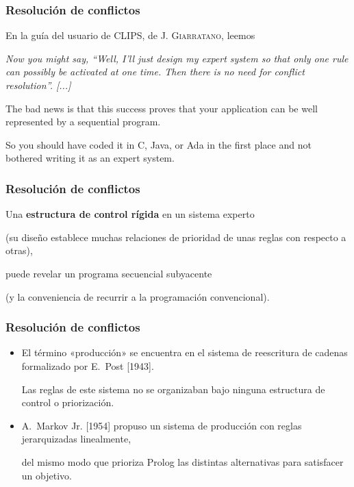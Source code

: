 \documentclass{beamer}    %
\begin{document}
\begin{frame}
 \frametitle{Resolución de conflictos}

 En la guía del usuario de CLIPS, de \textsc{J. Giarratano},
 leemos
 \vspace{5mm}

 \hfill\parbox{.85\linewidth}
 {\it Now you might say, “Well, I’ll just design my expert
   system so that only one rule can possibly be activated at
   one time. Then there is no need for conflict
   resolution”. [...]
   \vspace{2mm}

   The bad news is that this success proves that your
   application can be well represented by a sequential
   program.
   \vspace{2mm}

   So you should have coded it in C, Java, or Ada in the
   first place and not bothered writing it as an expert
   system.}
\end{frame}

\begin{frame}
 \frametitle{Resolución de conflictos}

 Una {\bf estructura de control rígida} en un sistema
 experto\\[2mm] \hfill\parbox{.85\linewidth}{(su diseño
   establece muchas relaciones de prioridad de unas reglas
   con respecto a otras),}
 \vspace{1cm}

 puede revelar un programa secuencial subyacente\\[2mm]
 \hfill\parbox{.85\linewidth}{(y la conveniencia de
   recurrir a la programación convencional).}
\end{frame}

\begin{frame}
 \frametitle{Resolución de conflictos}

 \begin{itemize}
 \item
 El término «producción» se encuentra en el sistema de
 reescritura de cadenas formalizado por {\sc E. Post}
 [1943].
 \vspace{3mm}

 Las reglas de este sistema no se organizaban bajo ninguna
 estructura de control o priorización.
 \vspace{7mm}

 \item
 {\sc A. Markov Jr.} [1954] propuso un sistema de producción
 con reglas jerarquizadas linealmente,
 \vspace{3mm}

 \hfill\parbox{.9\linewidth}{\small del mismo modo que
   prioriza Prolog las distintas alternativas para
   satisfacer un objetivo.}
 \end{itemize}
\end{frame}
\end{document}
